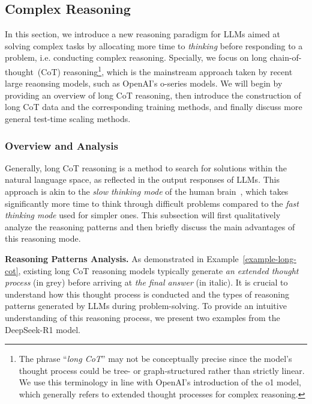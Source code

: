 \subsection{Complex Reasoning}\label{sec-long-cot}
In this section, we introduce a new reasoning paradigm for LLMs aimed at solving complex tasks by allocating more time to \emph{thinking} before responding to a problem, i.e. conducting complex reasoning. Specially, we focus on long chain-of-thought~(CoT) reasoning\footnote{The phrase ``\emph{long CoT}'' may not be conceptually precise since the model's thought process could be tree- or graph-structured rather than strictly linear. We use this terminology in line with OpenAI's introduction of the o1 model, which generally refers to extended thought processes for complex reasoning.}, which is the mainstream approach taken by recent large reaonsing models, such as OpenAI's o-series models. We will begin by providing an overview of long CoT reasoning, then introduce the construction of long CoT data and the corresponding training methods, and finally discuss more general test-time scaling methods.

\subsubsection{Overview and Analysis}\label{subsec-long-cot-intro}
Generally, long CoT reasoning is a method to search for solutions within the natural language space, as reflected in the output responses of LLMs. This approach is akin to the \emph{slow thinking mode} of the human brain~\cite{kahneman-2011-thinking-book}, which takes significantly more time to think through difficult problems compared to the \emph{fast thinking mode} used for simpler ones. This subsection will first qualitatively analyze the  reasoning patterns and then briefly discuss the main advantages of this reasoning mode. 

\textbf{Reasoning Patterns Analysis.} As demonstrated in Example~\ref{example-long-cot}, existing long CoT reasoning models typically generate \emph{an extended thought process} (in grey) before arriving at \emph{the final answer} (in italic). It is crucial to understand how this thought process is conducted and the types of reasoning patterns generated by LLMs during problem-solving. To provide an intuitive understanding of this reasoning process, we present two examples from the DeepSeek-R1 model.

